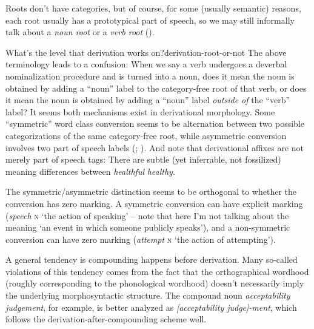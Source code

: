 \documentclass[UTF8, a4paper, oneside, scheme=plain]{ctexrep}
\newcommand*{\citepage}[1]{p.~{#1}}
\newcommand*{\term}[1]{\emph{#1}}
\newcommand{\corpus}[1]{\emph{#1}}
\newcommand{\corpuscat}[1]{\textsc{#1}}
\newcommand{\translate}[1]{`#1'}
\begin{document}
Roots don't have categories,
but of course, for some (usually semantic) reasons,
each root usually has a prototypical part of speech,
so we may still informally talk about a \term{noun root} or a \term{verb root} 
().

\begin{infobox}{What's the level that derivation works on?}{derivation-root-or-not}
    The above terminology leads to a confusion:
    When we say a verb undergoes a deverbal nominalization procedure
    and is turned into a noun,
    does it mean the noun is obtained by 
    adding a ``noun'' label to the category-free root of that verb,
    or does it mean the noun is obtained by adding a ``noun'' label 
    \emph{outside of} the ``verb'' label?
    It seems both mechanisms exist in derivational morphology.
    Some ``symmetric'' word class conversion seems to be 
    alternation between two possible categorizations of the same category-free root,
    while asymmetric conversion involves two part of speech labels 
    (\citealt[\citepage{1641}]{cgel}; \citealt[\citepage{62}, (15)]{siddiqi2009syntax}).
    And note that derivational affixes are not merely part of speech tags:
    There are subtle (yet inferrable, not fossilized) meaning differences between 
    \corpus{healthful} \corpus{healthy}.
\end{infobox}

The symmetric/asymmetric distinction seems to be orthogonal to 
whether the conversion has zero marking.
A symmetric conversion can have explicit marking
(\corpus{speech} \corpuscat{n} \translate{the action of speaking} -- 
note that here I'm not talking about the meaning \translate{an event in which someone publicly speaks}), 
and a non-symmetric conversion can have zero marking
(\corpus{attempt} \corpuscat{n} \translate{the action of attempting}).

A general tendency is compounding happens before derivation.
Many so-called violations of this tendency comes from the fact 
that the orthographical wordhood 
(roughly corresponding to the phonological wordhood)
doesn't necessarily imply the underlying morphosyntactic structure.
The compound noun \corpus{acceptability judgement},
for example, is better analyzed as 
\corpus{[acceptability judge]-ment},
which follows the derivation-after-compounding scheme well.
\end{document}
